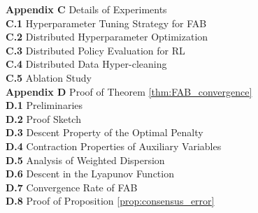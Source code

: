 \documentclass{article}
\theoremstyle{plain}
\theoremstyle{definition}
\theoremstyle{remark}
\begin{document}
\noindent \textbf{Appendix C} \quad Details of Experiments \dotfill \pageref{app:details_exp} \\
\noindent \hspace*{2em} \textbf{C.1} \quad Hyperparameter Tuning Strategy for FAB \dotfill \pageref{details:hptune} \\
\noindent \hspace*{2em} \textbf{C.2} \quad Distributed Hyperparameter Optimization \dotfill \pageref{app:details_hyper} \\
\noindent \hspace*{2em} \textbf{C.3} \quad Distributed Policy Evaluation for RL \dotfill \pageref{app:details_rl} \\
\noindent \hspace*{2em} \textbf{C.4} \quad Distributed Data Hyper-cleaning \dotfill \pageref{app:details_cleaning} \\
\noindent \hspace*{2em} \textbf{C.5} \quad Ablation Study \dotfill \pageref{app:details_ablation} \\


\noindent \textbf{Appendix D} \quad Proof of Theorem \ref{thm:FAB_convergence} \dotfill \pageref{app:proof_fab} \\
\noindent \hspace*{2em} \textbf{D.1} \quad Preliminaries \dotfill \pageref{app:fab_prelim} \\
\noindent \hspace*{2em} \textbf{D.2} \quad Proof Sketch \dotfill \pageref{app:fab_sketch} \\
\noindent \hspace*{2em} \textbf{D.3} \quad Descent Property of the Optimal Penalty \dotfill \pageref{app:fab_descent} \\
\noindent \hspace*{2em} \textbf{D.4} \quad Contraction Properties of Auxiliary Variables \dotfill \pageref{app:fab_contract} \\
\noindent \hspace*{2em} \textbf{D.5} \quad Analysis of Weighted Dispersion \dotfill \pageref{app:fab_dispersion} \\
\noindent \hspace*{2em} \textbf{D.6} \quad Descent in the Lyapunov Function \dotfill \pageref{app:fab_lyapunov} \\
\noindent \hspace*{2em} \textbf{D.7} \quad Convergence Rate of FAB \dotfill \pageref{app:fab_rate} \\
\noindent \hspace*{2em} \textbf{D.8} \quad Proof of Proposition \ref{prop:consensus_error} \dotfill \pageref{app:fab_prop} \\
\end{document}
